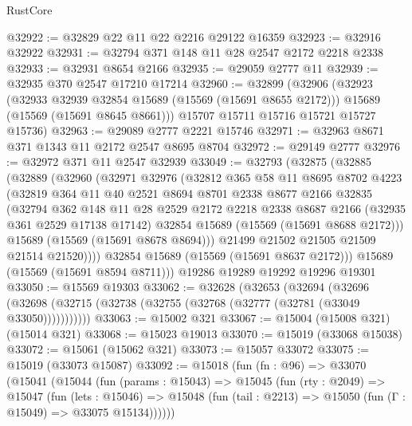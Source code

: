 \begin{lexlean}{RustCore}
\begin{coremodule}
@32922 := @32829 @22 @11 @22 @2216 @29122 @16359
@32923 := @32916 @32922
@32931 := @32794 @371 @148 @11 @28 @2547 @2172 @2218 @2338
@32933 := @32931 @8654 @2166
@32935 := @29059 @2777 @11
@32939 := @32935 @370 @2547 @17210 @17214
@32960 := @32899
    (@32906
      (@32923
        (@32933 @32939 @32854 @15689 (@15569 (@15691 @8655 @2172)))
        @15689
        (@15569 (@15691 @8645 @8661)))
      @15707
      @15711
      @15716
      @15721
      @15727
      @15736)
@32963 := @29089 @2777 @2221 @15746
@32971 := @32963 @8671 @371 @1343 @11 @2172 @2547 @8695 @8704
@32972 := @29149 @2777
@32976 := @32972 @371 @11 @2547 @32939
@33049 := @32793
    (@32875
      (@32885
        (@32889
          (@32960
            (@32971
              @32976
              (@32812
                @365
                @58
                @11
                @8695
                @8702
                @4223
                (@32819
                  @364
                  @11
                  @40
                  @2521
                  @8694
                  @8701
                  @2338
                  @8677
                  @2166
                  @32835
                  (@32794
                    @362
                    @148
                    @11
                    @28
                    @2529
                    @2172
                    @2218
                    @2338
                    @8687
                    @2166
                    (@32935 @361 @2529 @17138 @17142)
                    @32854
                    @15689
                    (@15569 (@15691 @8688 @2172)))
                  @15689
                  (@15569 (@15691 @8678 @8694)))
                @21499
                @21502
                @21505
                @21509
                @21514
                @21520))))
        @32854
        @15689
        (@15569 (@15691 @8637 @2172)))
      @15689
      (@15569 (@15691 @8594 @8711)))
    @19286
    @19289
    @19292
    @19296
    @19301
@33050 := @15569 @19303
@33062 := @32628
    (@32653
      (@32694
        (@32696 (@32698 (@32715 (@32738 (@32755 (@32768 (@32777 (@32781 (@33049 @33050)))))))))))
@33063 := @15002 @321
@33067 := @15004 (@15008 @321) (@15014 @321)
@33068 := @15023 @19013
@33070 := @15019 (@33068 @15038)
@33072 := @15061 (@15062 @321)
@33073 := @15057 @33072
@33075 := @15019 (@33073 @15087)
@33092 := @15018
    (fun (fn : @96) =>
    @33070
      (@15041
        (@15044
          (fun (params : @15043) =>
          @15045
            (fun (rty : @2049) =>
            @15047
              (fun (lets : @15046) =>
              @15048 (fun (tail : @2213) => @15050 (fun (Γ : @15049) => @33075 @15134))))))

\end{coremodule}
\end{lexlean}
